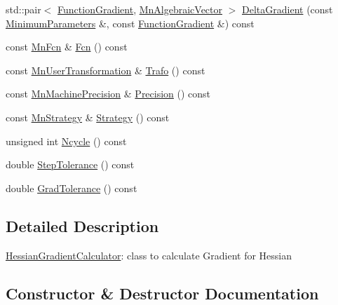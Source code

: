 \begin{DoxyCompactItemize}
\item 
std\+::pair$<$ \mbox{\hyperlink{classROOT_1_1Minuit2_1_1FunctionGradient}{Function\+Gradient}}, \mbox{\hyperlink{namespaceROOT_1_1Minuit2_a62ed97730a1ca8d3fbaec64a19aa11c9}{Mn\+Algebraic\+Vector}} $>$ \mbox{\hyperlink{classROOT_1_1Minuit2_1_1HessianGradientCalculator_a808c1f808c436fbb6b67cb8af13d0480}{Delta\+Gradient}} (const \mbox{\hyperlink{classROOT_1_1Minuit2_1_1MinimumParameters}{Minimum\+Parameters}} \&, const \mbox{\hyperlink{classROOT_1_1Minuit2_1_1FunctionGradient}{Function\+Gradient}} \&) const
\item 
const \mbox{\hyperlink{classROOT_1_1Minuit2_1_1MnFcn}{Mn\+Fcn}} \& \mbox{\hyperlink{classROOT_1_1Minuit2_1_1HessianGradientCalculator_ae23f4348f9a64595c39db48aa48d9e09}{Fcn}} () const
\item 
const \mbox{\hyperlink{classROOT_1_1Minuit2_1_1MnUserTransformation}{Mn\+User\+Transformation}} \& \mbox{\hyperlink{classROOT_1_1Minuit2_1_1HessianGradientCalculator_a4b122eecb0217cab813601572ccbac74}{Trafo}} () const
\item 
const \mbox{\hyperlink{classROOT_1_1Minuit2_1_1MnMachinePrecision}{Mn\+Machine\+Precision}} \& \mbox{\hyperlink{classROOT_1_1Minuit2_1_1HessianGradientCalculator_a256d75d036a5c53b0b679830ca4ac714}{Precision}} () const
\item 
const \mbox{\hyperlink{classROOT_1_1Minuit2_1_1MnStrategy}{Mn\+Strategy}} \& \mbox{\hyperlink{classROOT_1_1Minuit2_1_1HessianGradientCalculator_a407171e2df12fa67e92c0e5b7a97bb8d}{Strategy}} () const
\item 
unsigned int \mbox{\hyperlink{classROOT_1_1Minuit2_1_1HessianGradientCalculator_a234641f72296f007b2d95b514be07138}{Ncycle}} () const
\item 
double \mbox{\hyperlink{classROOT_1_1Minuit2_1_1HessianGradientCalculator_ac66592218817d4cbc8a3be76938b435d}{Step\+Tolerance}} () const
\item 
double \mbox{\hyperlink{classROOT_1_1Minuit2_1_1HessianGradientCalculator_a17febf33fcbeafa556e703d8bbe3d1db}{Grad\+Tolerance}} () const
\end{DoxyCompactItemize}


\subsection{Detailed Description}
\mbox{\hyperlink{classROOT_1_1Minuit2_1_1HessianGradientCalculator}{Hessian\+Gradient\+Calculator}}\+: class to calculate Gradient for Hessian 

\subsection{Constructor \& Destructor Documentation}
\mbox{\label{classROOT_1_1Minuit2_1_1HessianGradientCalculator_af298f780f59cb2be1ac5e676af07f82b}} 
